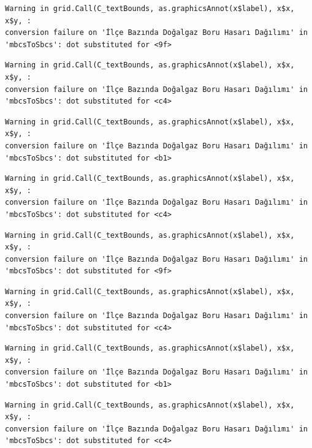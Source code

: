 \documentclass[
  11pt,
  a4paper,
  DIV=11,
  numbers=noendperiod]{scrartcl}
\begin{document}
\begin{verbatim}
Warning in grid.Call(C_textBounds, as.graphicsAnnot(x$label), x$x, x$y, :
conversion failure on 'İlçe Bazında Doğalgaz Boru Hasarı Dağılımı' in
'mbcsToSbcs': dot substituted for <9f>
\end{verbatim}

\begin{verbatim}
Warning in grid.Call(C_textBounds, as.graphicsAnnot(x$label), x$x, x$y, :
conversion failure on 'İlçe Bazında Doğalgaz Boru Hasarı Dağılımı' in
'mbcsToSbcs': dot substituted for <c4>
\end{verbatim}

\begin{verbatim}
Warning in grid.Call(C_textBounds, as.graphicsAnnot(x$label), x$x, x$y, :
conversion failure on 'İlçe Bazında Doğalgaz Boru Hasarı Dağılımı' in
'mbcsToSbcs': dot substituted for <b1>
\end{verbatim}

\begin{verbatim}
Warning in grid.Call(C_textBounds, as.graphicsAnnot(x$label), x$x, x$y, :
conversion failure on 'İlçe Bazında Doğalgaz Boru Hasarı Dağılımı' in
'mbcsToSbcs': dot substituted for <c4>
\end{verbatim}

\begin{verbatim}
Warning in grid.Call(C_textBounds, as.graphicsAnnot(x$label), x$x, x$y, :
conversion failure on 'İlçe Bazında Doğalgaz Boru Hasarı Dağılımı' in
'mbcsToSbcs': dot substituted for <9f>
\end{verbatim}

\begin{verbatim}
Warning in grid.Call(C_textBounds, as.graphicsAnnot(x$label), x$x, x$y, :
conversion failure on 'İlçe Bazında Doğalgaz Boru Hasarı Dağılımı' in
'mbcsToSbcs': dot substituted for <c4>
\end{verbatim}

\begin{verbatim}
Warning in grid.Call(C_textBounds, as.graphicsAnnot(x$label), x$x, x$y, :
conversion failure on 'İlçe Bazında Doğalgaz Boru Hasarı Dağılımı' in
'mbcsToSbcs': dot substituted for <b1>
\end{verbatim}

\begin{verbatim}
Warning in grid.Call(C_textBounds, as.graphicsAnnot(x$label), x$x, x$y, :
conversion failure on 'İlçe Bazında Doğalgaz Boru Hasarı Dağılımı' in
'mbcsToSbcs': dot substituted for <c4>
\end{verbatim}
\end{document}
